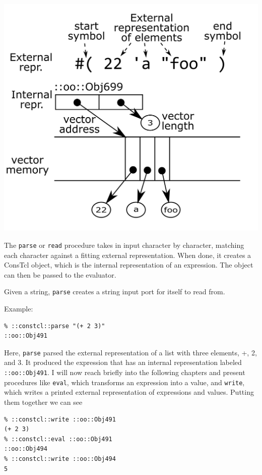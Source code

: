 \documentclass[twoside]{report}
\begin{document}
\includegraphics{images/vector-representation.png}

The \texttt{parse} or \texttt{read} procedure takes in input character by character, matching each character against a fitting external representation. When done, it creates a ConsTcl object, which is the internal representation of an expression. The object can then be passed to the evaluator.

Given a string, \texttt{parse} creates a string input port for itself to read from.

Example:

\begin{verbatim}
% ::constcl::parse "(+ 2 3)"
::oo::Obj491
\end{verbatim}

Here, \texttt{parse} parsed the external representation of a list with three elements, +, 2, and 3. It produced the expression that has an internal representation labeled \texttt{::oo::Obj491}. I will now reach briefly into the following chapters and present procedures like \texttt{eval}, which transforms an expression into a value, and \texttt{write}, which writes a printed external representation of expressions and values. Putting them together we can see

\begin{verbatim}
% ::constcl::write ::oo::Obj491
(+ 2 3)
% ::constcl::eval ::oo::Obj491
::oo::Obj494
% ::constcl::write ::oo::Obj494
5
\end{verbatim}
\end{document}
